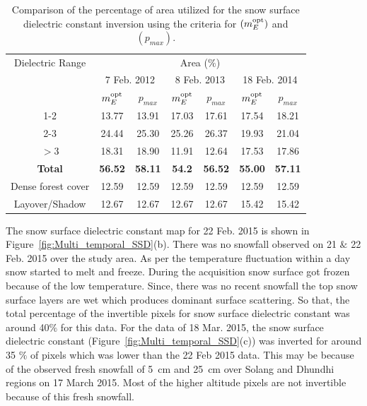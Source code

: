 \begin{table}[!htbp]
	\caption[Comparison of invertible pixels by both the optimization techniques]{Comparison of the percentage of area utilized for the snow surface dielectric constant inversion using the criteria for $(m_{E}^{\mbox{\scriptsize opt}})$ and $(p_{max})$. }
	\begin{center}
		\begin{tabular}{|c|c|c||c|c||c|c|} \hline
			Dielectric Range & \multicolumn{6}{c|}{Area ($\%$)} \\
			\cline{2-7}
			& \multicolumn{2}{c||}{7 Feb. 2012} & \multicolumn{2}{c||}{8 Feb. 2013} & \multicolumn{2}{c|}{18 Feb. 2014}\\
			\cline{2-7}
			& $m_{E}^{\mbox{\scriptsize opt}}$ & $ p_{max}$ & $m_{E}^{\mbox{\scriptsize opt}}$ & $p_{max}$ & $m_{E}^{\mbox{\scriptsize opt}}$ & $p_{max}$ \\ \hline
			1-2 &	13.77 & 13.91 & 17.03 & 17.61 & 17.54 & 18.21 \\ \hline
			2-3 &	24.44 & 25.30 & 25.26 & 26.37 & 19.93 & 21.04 \\ \hline
			$>$3&   18.31 & 18.90 & 11.91 & 12.64 & 17.53 & 17.86 \\ \hline
			\bf Total&  \bf 56.52 & \bf 58.11 & \bf 54.2 & \bf 56.52 & \bf 55.00 & \bf 57.11 \\ \hline \hline
			Dense forest cover & 12.59 &	12.59 &	12.59 & 12.59 & 12.59 & 12.59 \\ \hline
			Layover/Shadow & 12.67 & 12.67 & 12.67 & 12.67 & 15.42 & 15.42 \\ \hline
		\end{tabular}
	\end{center}
	\label{table:SSD_range}
\end{table}

The snow surface dielectric constant map for 22 Feb. 2015 is shown in Figure~\ref{fig:Multi_temporal_SSD}(b). There was no snowfall observed on 21 $\&$ 22 Feb. 2015 over the study area. As per the temperature fluctuation within a day snow started to melt and freeze. During the acquisition snow surface got frozen because of the low temperature. Since, there was no recent snowfall the top snow surface layers are wet which produces dominant surface scattering. So that, the total percentage of the invertible pixels for snow surface dielectric constant was around 40$\%$ for this data. For the data of 18 Mar. 2015, the snow surface dielectric constant (Figure~\ref{fig:Multi_temporal_SSD}(c)) was inverted for around 35 $\%$ of pixels which was lower than the 22 Feb 2015 data. This may be because of the observed fresh snowfall of 5~cm and 25~cm over Solang and Dhundhi regions on 17 March 2015.  Most of the higher altitude pixels are not invertible because of this fresh snowfall.

